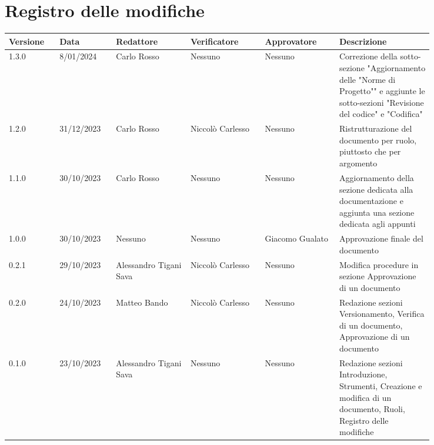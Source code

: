 \section*{Registro delle modifiche}
 {
  \scriptsize
  \begin{tabular}{p{0.10\linewidth}p{0.10\linewidth}p{0.15\linewidth}p{0.15\linewidth}p{0.15\linewidth}p{0.19\linewidth}}
	  \textbf{Versione} & \textbf{Data} & \textbf{Redattore}     & \textbf{Verificatore} & \textbf{Approvatore} & \textbf{Descrizione}                                                                                             \\
	  \hline
	  1.3.0             & 8/01/2024     & Carlo Rosso            & Nessuno               & Nessuno              & Correzione della sotto-sezione "Aggiornamento
	  delle "Norme di Progetto"" e aggiunte le sotto-sezioni "Revisione del codice" e "Codifica"                                                                                                                                   \\
	  \hline
	  1.2.0             & 31/12/2023    & Carlo Rosso            & Niccolò Carlesso      & Nessuno              & Ristrutturazione del documento per ruolo, piuttosto che per argomento                                            \\
	  \hline
	  1.1.0             & 30/10/2023    & Carlo Rosso            & Nessuno               & Nessuno              & Aggiornamento della sezione dedicata alla documentazione e aggiunta una sezione dedicata agli appunti            \\
	  \hline
	  1.0.0             & 30/10/2023    & Nessuno                & Nessuno               & Giacomo Gualato      & Approvazione finale del documento                                                                                \\
	  \hline
	  0.2.1             & 29/10/2023    & Alessandro Tigani Sava & Niccolò Carlesso      & Nessuno              & Modifica procedure in sezione Approvazione di un documento                                                       \\
	  \hline
	  0.2.0             & 24/10/2023    & Matteo Bando           & Niccolò Carlesso      & Nessuno              & Redazione sezioni Versionamento, Verifica di un documento, Approvazione di un documento                          \\
	  \hline
	  0.1.0             & 23/10/2023    & Alessandro Tigani Sava & Nessuno               & Nessuno              & Redazione sezioni Introduzione, Strumenti, Creazione e modifica di un documento, Ruoli, Registro delle modifiche \\
	  \hline
  \end{tabular}
 }

